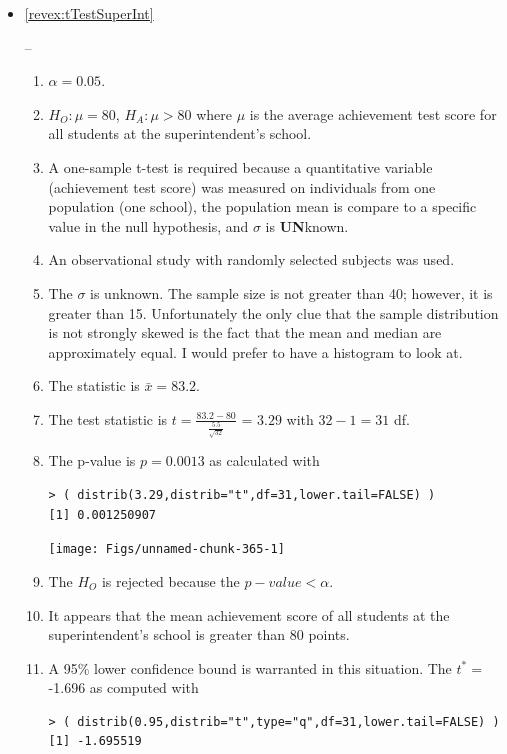 \documentclass[10pt,openany]{book}\usepackage[]{graphicx}\usepackage[]{color}
\makeatletter
\newenvironment{kframe}{%
 \def\at@end@of@kframe{}%
 \ifinner\ifhmode%
  \def\at@end@of@kframe{\end{minipage}}%
  \begin{minipage}{\columnwidth}%
 \fi\fi%
 \def\FrameCommand##1{\hskip\@totalleftmargin \hskip-\fboxsep
 \colorbox{shadecolor}{##1}\hskip-\fboxsep
     \hskip-\linewidth \hskip-\@totalleftmargin \hskip\columnwidth}%
 \MakeFramed {\advance\hsize-\width
   \@totalleftmargin\z@ \linewidth\hsize
   \@setminipage}}%
 {\par\unskip\endMakeFramed%
 \at@end@of@kframe}
\newenvironment{knitrout}{}{} %
\makeatother
\begin{document}
\begin{itemize}
  \item \hypertarget{ans:tTestSuperInt}{\ref{revex:tTestSuperInt}} --
    \begin{enumerate}
      \item $\alpha=0.05$.
      \item $H_{O}:\mu=80$, $H_{A}:\mu>80$ where $\mu$ is the average achievement test score for all students at the superintendent's school.
      \item A one-sample t-test is required because a quantitative variable (achievement test score) was measured on individuals from one population (one school), the population mean is compare to a specific value in the null hypothesis, and $\sigma$ is \textbf{UN}known.
      \item An observational study with randomly selected subjects was used.
      \item The $\sigma$ is unknown.  The sample size is not greater than 40; however, it is greater than 15.  Unfortunately the only clue that the sample distribution is not strongly skewed is the fact that the mean and median are approximately equal.  I would prefer to have a histogram to look at.
      \item The statistic is $\bar{x}=83.2$.
      \item The test statistic is $t=\frac{83.2-80}{\frac{5.5}{\sqrt{32}}}$ = $3.29$ with $32-1=31$ df.
      \item The p-value is $p=0.0013$ as calculated with
\begin{knitrout}
\color{fgcolor}\begin{kframe}
\begin{verbatim}
> ( distrib(3.29,distrib="t",df=31,lower.tail=FALSE) )
[1] 0.001250907
\end{verbatim}
\end{kframe}

{\centering \texttt{[image: Figs/unnamed-chunk-365-1]} 

}



\end{knitrout}
      \item The $H_{O}$ is rejected because the $p-value<\alpha$.
      \item It appears that the mean achievement score of all students at the superintendent's school is greater than 80 points.
      \item A 95\% lower confidence bound is warranted in this situation.  The $t^{*}=$-1.696 as computed with
\begin{knitrout}
\color{fgcolor}\begin{kframe}
\begin{verbatim}
> ( distrib(0.95,distrib="t",type="q",df=31,lower.tail=FALSE) )
[1] -1.695519
\end{verbatim}
\end{kframe}


\end{knitrout}
\end{enumerate}
\end{itemize}
\end{document}
